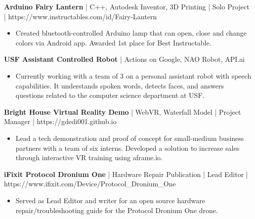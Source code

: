 
\textbf{Arduino Fairy Lantern} | C++, Autodesk Inventor, 3D Printing | Solo Project | https://www.instructables.com/id/Fairy-Lantern
\begin{itemize}
\item Created bluetooth-controlled Arduino lamp that can open, close and change colors via Android app. Awarded 1st place for Best Instructable.
\end{itemize}


\textbf{USF Assistant Controlled Robot} | Actions on Google, NAO Robot, API.ai
\begin{itemize}
\item Currently working with a team of 3 on a personal assistant robot with speech capabilities. It understands spoken words, detects faces, and answers questions related to the computer science department at USF.                                                 
\end{itemize}

\textbf{Bright House Virtual Reality Demo} | WebVR, Waterfall Model | Project Manager | https://gdedi001.github.io
\begin{itemize}
\item Lead a tech demonstration and proof of concept for small-medium business partners with a team of six interns. Developed a solution to increase sales through interactive VR training using aframe.io.                           
\end{itemize}


\textbf{iFixit Protocol Dronium One} | Hardware Repair Publication | Lead Editor |  https://www.ifixit.com/Device/Protocol\_Dronium\_One
\begin{itemize}
\item Served as Lead Editor and writer for an open source hardware repair/troubleshooting guide for the Protocol Dronium One drone.                                                
\end{itemize}